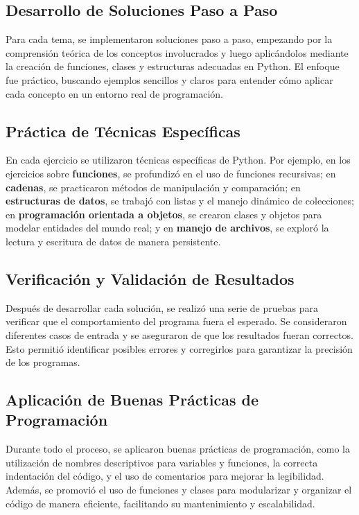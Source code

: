 \documentclass[conference]{IEEEtran}
\begin{document}
\subsection{Desarrollo de Soluciones Paso a Paso}
Para cada tema, se implementaron soluciones paso a paso, empezando por la comprensión teórica de los conceptos involucrados y luego aplicándolos mediante la creación de funciones, clases y estructuras adecuadas en Python. El enfoque fue práctico, buscando ejemplos sencillos y claros para entender cómo aplicar cada concepto en un entorno real de programación.

\subsection{Práctica de Técnicas Específicas}
En cada ejercicio se utilizaron técnicas específicas de Python. Por ejemplo, en los ejercicios sobre \textbf{funciones}, se profundizó en el uso de funciones recursivas; en \textbf{cadenas}, se practicaron métodos de manipulación y comparación; en \textbf{estructuras de datos}, se trabajó con listas y el manejo dinámico de colecciones; en \textbf{programación orientada a objetos}, se crearon clases y objetos para modelar entidades del mundo real; y en \textbf{manejo de archivos}, se exploró la lectura y escritura de datos de manera persistente.

\subsection{Verificación y Validación de Resultados}
Después de desarrollar cada solución, se realizó una serie de pruebas para verificar que el comportamiento del programa fuera el esperado. Se consideraron diferentes casos de entrada y se aseguraron de que los resultados fueran correctos. Esto permitió identificar posibles errores y corregirlos para garantizar la precisión de los programas.

\subsection{Aplicación de Buenas Prácticas de Programación}
Durante todo el proceso, se aplicaron buenas prácticas de programación, como la utilización de nombres descriptivos para variables y funciones, la correcta indentación del código, y el uso de comentarios para mejorar la legibilidad. Además, se promovió el uso de funciones y clases para modularizar y organizar el código de manera eficiente, facilitando su mantenimiento y escalabilidad.
\end{document}
